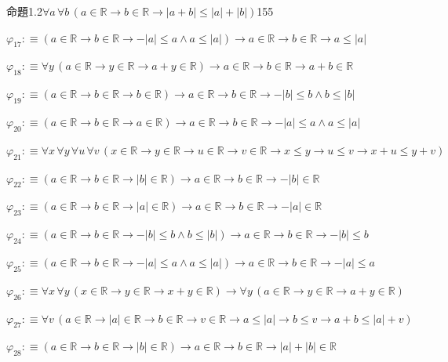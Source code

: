\begin{fullproof}{命題1.2}{$\forall a\,\forall b\,(a \in \mathbb{R} \to b \in \mathbb{R} \to \lvert a + b \rvert \leq \lvert a \rvert + \lvert b \rvert)$}{155}
\begin{abbrevlist}
\item $\varphi_{17} :\equiv (a \in \mathbb{R} \to b \in \mathbb{R} \to -\lvert a \rvert \leq a \land a \leq \lvert a \rvert) \to a \in \mathbb{R} \to b \in \mathbb{R} \to a \leq \lvert a \rvert$
\item $\varphi_{18} :\equiv \forall y\,(a \in \mathbb{R} \to y \in \mathbb{R} \to a + y \in \mathbb{R}) \to a \in \mathbb{R} \to b \in \mathbb{R} \to a + b \in \mathbb{R}$
\item $\varphi_{19} :\equiv (a \in \mathbb{R} \to b \in \mathbb{R} \to b \in \mathbb{R}) \to a \in \mathbb{R} \to b \in \mathbb{R} \to -\lvert b \rvert \leq b \land b \leq \lvert b \rvert$
\item $\varphi_{20} :\equiv (a \in \mathbb{R} \to b \in \mathbb{R} \to a \in \mathbb{R}) \to a \in \mathbb{R} \to b \in \mathbb{R} \to -\lvert a \rvert \leq a \land a \leq \lvert a \rvert$
\item $\varphi_{21} :\equiv \forall x\,\forall y\,\forall u\,\forall v\,(x \in \mathbb{R} \to y \in \mathbb{R} \to u \in \mathbb{R} \to v \in \mathbb{R} \to x \leq y \to u \leq v \to x + u \leq y + v)$
\item $\varphi_{22} :\equiv (a \in \mathbb{R} \to b \in \mathbb{R} \to \lvert b \rvert \in \mathbb{R}) \to a \in \mathbb{R} \to b \in \mathbb{R} \to -\lvert b \rvert \in \mathbb{R}$
\item $\varphi_{23} :\equiv (a \in \mathbb{R} \to b \in \mathbb{R} \to \lvert a \rvert \in \mathbb{R}) \to a \in \mathbb{R} \to b \in \mathbb{R} \to -\lvert a \rvert \in \mathbb{R}$
\item $\varphi_{24} :\equiv (a \in \mathbb{R} \to b \in \mathbb{R} \to -\lvert b \rvert \leq b \land b \leq \lvert b \rvert) \to a \in \mathbb{R} \to b \in \mathbb{R} \to -\lvert b \rvert \leq b$
\item $\varphi_{25} :\equiv (a \in \mathbb{R} \to b \in \mathbb{R} \to -\lvert a \rvert \leq a \land a \leq \lvert a \rvert) \to a \in \mathbb{R} \to b \in \mathbb{R} \to -\lvert a \rvert \leq a$
\item $\varphi_{26} :\equiv \forall x\,\forall y\,(x \in \mathbb{R} \to y \in \mathbb{R} \to x + y \in \mathbb{R}) \to \forall y\,(a \in \mathbb{R} \to y \in \mathbb{R} \to a + y \in \mathbb{R})$
\item $\varphi_{27} :\equiv \forall v\,(a \in \mathbb{R} \to \lvert a \rvert \in \mathbb{R} \to b \in \mathbb{R} \to v \in \mathbb{R} \to a \leq \lvert a \rvert \to b \leq v \to a + b \leq \lvert a \rvert + v)$
\item $\varphi_{28} :\equiv (a \in \mathbb{R} \to b \in \mathbb{R} \to \lvert b \rvert \in \mathbb{R}) \to a \in \mathbb{R} \to b \in \mathbb{R} \to \lvert a \rvert + \lvert b \rvert \in \mathbb{R}$

\end{abbrevlist}
\end{fullproof}
